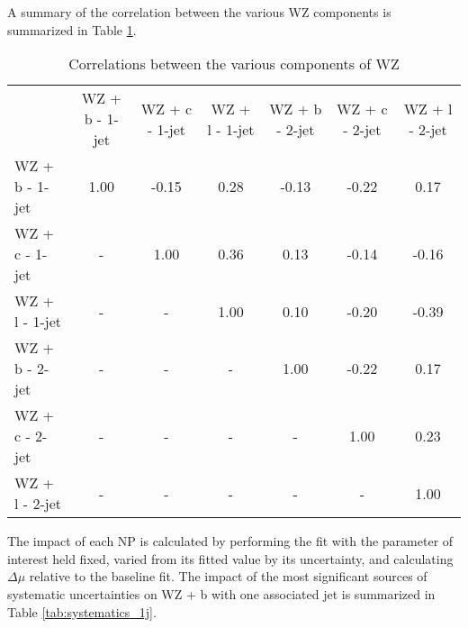 A summary of the correlation between the various WZ components is summarized in Table \ref{tab:WZ_corr}.

\hspace{-1in}\begin{table}[H]
\begin{adjustwidth}{-3em}{-3em}
\begin{center}
\begin{tabular}{l|cccccc}
\hline
 & WZ + b - 1-jet & WZ + c - 1-jet & WZ + l - 1-jet & WZ + b - 2-jet & WZ + c - 2-jet & WZ + l - 2-jet\\
WZ + b - 1-jet & 1.00 & -0.15 & 0.28 & -0.13 & -0.22 & 0.17 \\
WZ + c - 1-jet & - & 1.00 & 0.36 & 0.13 & -0.14 & -0.16 \\
WZ + l - 1-jet & - & - & 1.00 & 0.10 & -0.20 & -0.39 \\
WZ + b - 2-jet & - & - & - & 1.00 & -0.22 & 0.17 \\
WZ + c - 2-jet & - & - & - & - & 1.00 & 0.23 \\
WZ + l - 2-jet & - & - & - & - & - & 1.00 \\
\hline
\end{tabular}
\caption{Correlations between the various components of WZ}
\label{tab:WZ_corr}
\end{center}
\end{adjustwidth}
\end{table}

The impact of each NP is calculated by performing the fit with the parameter of interest held fixed, varied from its fitted value by its uncertainty, and calculating $\Delta\mu$ relative to the baseline fit.  The impact of the most significant sources of systematic uncertainties on WZ + b with one associated jet is summarized in Table \ref{tab:systematics_1j}. 

